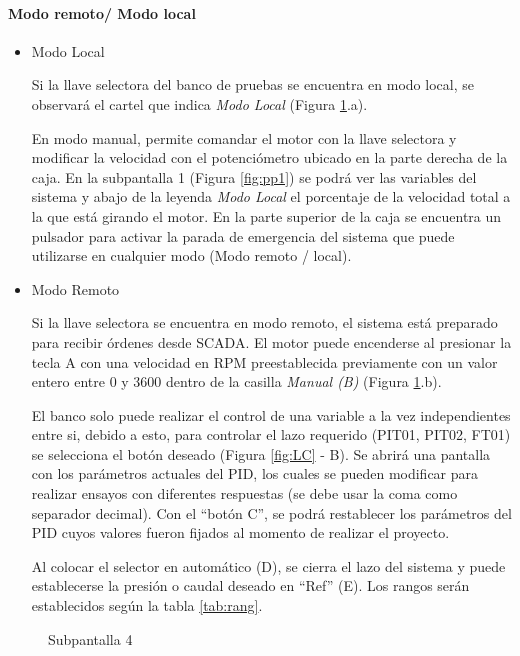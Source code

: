 \paragraph{Modo remoto/ Modo local}
\begin{itemize}
	\item Modo Local
	
	Si la llave selectora del banco de pruebas se encuentra en modo local, se observará el cartel que indica \textit{Modo Local} (Figura \ref{fig:localremoto}.a).
	
	En modo manual, permite comandar el motor con la llave selectora y modificar la velocidad con el potenciómetro ubicado en la parte derecha de la caja. En la subpantalla 1 (Figura \ref{fig:pp1}) se podrá ver las variables del sistema y abajo de la leyenda\textit{ Modo Local} el porcentaje de la velocidad total a la que está girando el motor. En la parte superior de la caja se encuentra un pulsador para activar la parada de emergencia del sistema que puede utilizarse en cualquier modo (Modo remoto / local). 
	
	\item Modo Remoto
	
	Si la llave selectora se encuentra en modo remoto, el sistema está preparado para recibir órdenes desde SCADA. El motor puede encenderse al presionar la tecla A con una velocidad en RPM preestablecida previamente con un valor entero entre 0 y 3600 dentro de la casilla \textit{Manual (B)}  (Figura \ref{fig:localremoto}.b). 
	
	El banco solo puede realizar el control de una variable a la vez independientes entre si, debido a esto, para controlar el lazo requerido (PIT01, PIT02, FT01) se selecciona el botón deseado (Figura \ref{fig:LC} - B). Se abrirá una pantalla con los parámetros actuales del PID, los cuales se pueden modificar para realizar ensayos con diferentes respuestas (se debe usar la coma como separador decimal). Con el ``botón C'', se podrá restablecer los parámetros del PID cuyos valores fueron fijados al momento de realizar el proyecto.
			
	Al colocar el selector en automático (D), se cierra el lazo del sistema y puede establecerse la presión o caudal deseado en ``Ref'' (E). Los rangos serán establecidos según la tabla \ref{tab:rang}. 
\end{itemize}

\begin{figure}[htbp]
	\centering
	\caption{Subpantalla 4} \label{fig:localremoto}
\end{figure}


